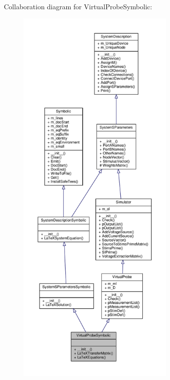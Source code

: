 Collaboration diagram for Virtual\+Probe\+Symbolic\+:
\nopagebreak
\begin{figure}[H]
\begin{center}
\leavevmode
\includegraphics[height=550pt]{classSignalIntegrity_1_1SystemDescriptions_1_1VirtualProbeSymbolic_1_1VirtualProbeSymbolic__coll__graph}
\end{center}
\end{figure}
